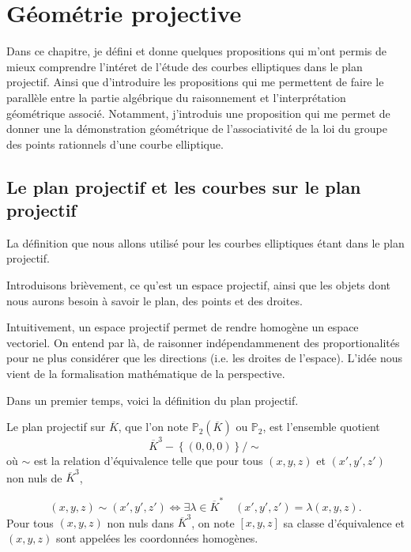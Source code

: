 \chapter{Géométrie projective}
\begin{center}
    Dans ce chapitre, je défini et donne quelques propositions qui m'ont permis de
    mieux comprendre l'intéret de l'étude des courbes elliptiques dans le plan
    projectif. Ainsi que d'introduire les propositions qui me permettent de faire le parallèle
    entre la partie algébrique du raisonnement et l'interprétation géométrique
    associé. Notamment, j'introduis une proposition qui me permet de donner une la
    démonstration géométrique de l'associativité de la loi du groupe des points rationnels
    d'une courbe elliptique.

\end{center}

\section{Le plan projectif et les courbes sur le plan projectif}

La définition que nous allons utilisé pour les courbes elliptiques étant dans le plan
projectif.

Introduisons brièvement, ce qu'est un espace projectif, ainsi que les objets dont nous aurons
besoin à savoir le plan, des points et des droites.

Intuitivement, un espace projectif permet de rendre homogène un espace vectoriel. On entend
par là, de raisonner indépendammenent des proportionalités pour ne plus considérer que les
directions (i.e. les droites de l'espace). L'idée nous vient de la formalisation mathématique de la perspective. 

Dans un premier temps, voici la définition du plan projectif.

\begin{definition}
    \label{def:planP2}
    
    Le plan projectif sur $\overline{K}$, que l'on note $\mathbb{P}_{2}(\overline{K})$ ou
    $\mathbb{P}_{2}$, est l'ensemble quotient
    \[
    \overline{K}^3 - \left\{ (0,0,0) \right\} / \sim
    \] 
    où $\sim$ est la relation d'équivalence telle que pour tous $\left( x,y,z \right) $ et
    $\left( x',y',z'\right) $ non nuls de $\overline{K}^3$,

    \[
    \left( x,y,z \right) \sim \left( x',y',z' \right) \iff \exists \lambda \in
    \overline{K}^{*} \quad \left( x',y',z' \right) = \lambda \left( x,y,z \right) 
    .\] 
    Pour tous $\left( x,y,z \right) $ non nuls dans $\overline{K}^3$, on note $\left[
    x,y,z \right] $ sa classe d'équivalence et $(x,y,z)$ sont appelées les coordonnées homogènes.
\end{definition}

